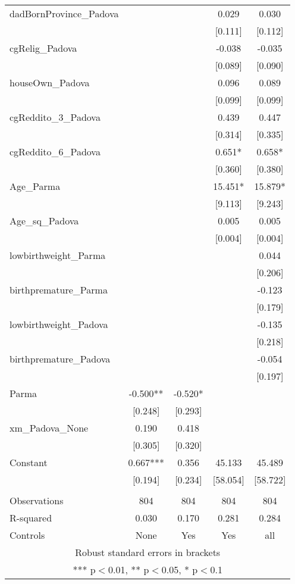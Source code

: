 \documentclass[]{article}
\begin{document}
\begin{tabular}{lcccc}
dadBornProvince\_Padova &  &  & 0.029 & 0.030 \\
 &  &  & [0.111] & [0.112] \\
cgRelig\_Padova &  &  & -0.038 & -0.035 \\
 &  &  & [0.089] & [0.090] \\
houseOwn\_Padova &  &  & 0.096 & 0.089 \\
 &  &  & [0.099] & [0.099] \\
cgReddito\_3\_Padova &  &  & 0.439 & 0.447 \\
 &  &  & [0.314] & [0.335] \\
cgReddito\_6\_Padova &  &  & 0.651* & 0.658* \\
 &  &  & [0.360] & [0.380] \\
Age\_Parma &  &  & 15.451* & 15.879* \\
 &  &  & [9.113] & [9.243] \\
Age\_sq\_Padova &  &  & 0.005 & 0.005 \\
 &  &  & [0.004] & [0.004] \\
lowbirthweight\_Parma &  &  &  & 0.044 \\
 &  &  &  & [0.206] \\
birthpremature\_Parma &  &  &  & -0.123 \\
 &  &  &  & [0.179] \\
lowbirthweight\_Padova &  &  &  & -0.135 \\
 &  &  &  & [0.218] \\
birthpremature\_Padova &  &  &  & -0.054 \\
 &  &  &  & [0.197] \\
Parma & -0.500** & -0.520* &  &  \\
 & [0.248] & [0.293] &  &  \\
xm\_Padova\_None & 0.190 & 0.418 &  &  \\
 & [0.305] & [0.320] &  &  \\
Constant & 0.667*** & 0.356 & 45.133 & 45.489 \\
 & [0.194] & [0.234] & [58.054] & [58.722] \\
 &  &  &  &  \\
Observations & 804 & 804 & 804 & 804 \\
R-squared & 0.030 & 0.170 & 0.281 & 0.284 \\
 Controls & None & Yes & Yes & all \\ \hline
\multicolumn{5}{c}{ Robust standard errors in brackets} \\
\multicolumn{5}{c}{ *** p$<$0.01, ** p$<$0.05, * p$<$0.1} \\
\end{tabular}
\end{document}
